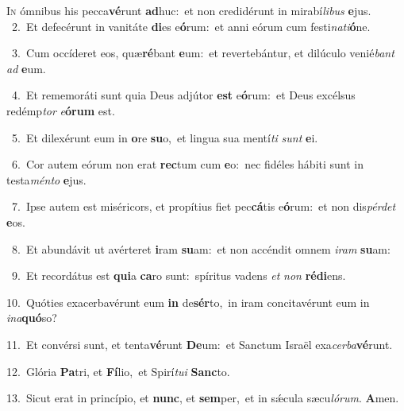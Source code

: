 \lettrine{\initial\textcolor{\initialcolor}{I}}{n} ómnibus his pecca\-\textbf{vé}\-runt \textbf{ad}\-huc:~\star et non credidérunt in mirabí\-\textit{li}\-\textit{bus} \textbf{e}\-jus.\\
{\numbfont\textcolor{\numbcolor}{~2.}}~Et defecérunt in vanitáte \textbf{di}\-es e\-\textbf{ó}\-rum:~\star et anni eórum cum festi\-\textit{na}\-\textit{ti}\textbf{ó}ne.\par
{\numbfont\textcolor{\numbcolor}{~3.}}~Cum occíderet eos, quæ\-\textbf{ré}\-bant \textbf{e}\-um:~\star et revertebántur, et dilúculo venié\textit{bant} \textit{ad} \textbf{e}\-um.\par
{\numbfont\textcolor{\numbcolor}{~4.}}~Et rememoráti sunt quia Deus adjútor \textbf{est} e\-\textbf{ó}\-rum:~\star et Deus excélsus redémp\textit{tor} \textit{e}\-\textbf{ó}\textbf{rum} est.\par
{\numbfont\textcolor{\numbcolor}{~5.}}~Et dilexérunt eum in \textbf{o}\-re \textbf{su}\-o,~\star et lingua sua mentí\textit{ti} \textit{sunt} \textbf{e}\-i.\par
{\numbfont\textcolor{\numbcolor}{~6.}}~Cor autem eórum non erat \textbf{rec}\-tum cum \textbf{e}\-o:~\star nec fidéles hábiti sunt in testa\-\textit{mén}\-\textit{to} \textbf{e}\-jus.\par
{\numbfont\textcolor{\numbcolor}{~7.}}~Ipse autem est miséricors, et propítius fiet pec\-\textbf{cá}\-tis e\-\textbf{ó}\-rum:~\star et non dis\-\textit{pér}\-\textit{det} \textbf{e}\-os.\par
{\numbfont\textcolor{\numbcolor}{~8.}}~Et abundávit ut avérteret \textbf{i}\-ram \textbf{su}\-am:~\star et non accéndit omnem \textit{i}\-\textit{ram} \textbf{su}\-am:\par
{\numbfont\textcolor{\numbcolor}{~9.}}~Et recordátus est \textbf{qui}\-a \textbf{ca}\-ro sunt:~\star spíritus vadens \textit{et} \textit{non} \textbf{réd}\-\textbf{i}ens.\par
{\numbfont\textcolor{\numbcolor}{10.}}~Quóties exacerbavérunt eum \textbf{in} de\-\textbf{sér}\-to,~\star in iram concitavérunt eum in \textit{in}\-\textit{a}\textbf{quó}so?\par
{\numbfont\textcolor{\numbcolor}{11.}}~Et convérsi sunt, et tenta\-\textbf{vé}\-runt \textbf{De}\-um:~\star et Sanctum Israël exa\-\textit{cer}\-\textit{ba}\textbf{vé}runt.\par
{\numbfont\textcolor{\numbcolor}{12.}}~Glória \textbf{Pa}\-tri, et \textbf{Fí}\-lio,~\star et Spirí\-\textit{tu}\-\textit{i} \textbf{Sanc}\-to.\par
{\numbfont\textcolor{\numbcolor}{13.}}~Sicut erat in princípio, et \textbf{nunc}\-, et \textbf{sem}\-per,~\star et in sǽcula sæcu\-\textit{ló}\-\textit{rum}. \textbf{A}\-men.\par
